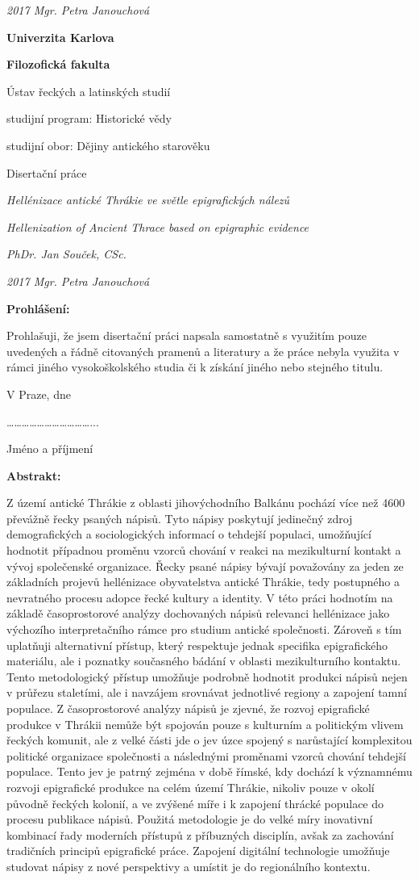 {\em 2017 Mgr. Petra Janouchová}

{\bf Univerzita Karlova}

{\bf Filozofická fakulta}

Ústav řeckých a latinských studií

studijní program: Historické vědy

studijní obor: Dějiny antického starověku

Disertační práce

{\em Hellénizace antické Thrákie ve světle epigrafických nálezů}

{\em Hellenization of Ancient Thrace based on epigraphic evidence}

{\em PhDr. Jan Souček, CSc.}

{\em 2017 Mgr. Petra Janouchová}

{\bf Prohlášení:}

Prohlašuji, že jsem disertační práci napsala samostatně s využitím pouze uvedených a řádně citovaných pramenů a literatury a že práce nebyla využita v rámci jiného vysokoškolského studia či k získání jiného nebo stejného titulu.

V Praze, dne

\ldots{}\ldots{}\ldots{}\ldots{}\ldots{}\ldots{}\ldots{}\ldots{}\ldots{}\ldots{}\ldots{}...

Jméno a příjmení

{\bf Abstrakt:}

Z území antické Thrákie z oblasti jihovýchodního Balkánu pochází více než 4600 převážně řecky psaných nápisů. Tyto nápisy poskytují jedinečný zdroj demografických a sociologických informací o tehdejší populaci, umožňující hodnotit případnou proměnu vzorců chování v reakci na mezikulturní kontakt a vývoj společenské organizace. Řecky psané nápisy bývají považovány za jeden ze základních projevů hellénizace obyvatelstva antické Thrákie, tedy postupného a nevratného procesu adopce řecké kultury a identity. V této práci hodnotím na základě časoprostorové analýzy dochovaných nápisů relevanci hellénizace jako výchozího interpretačního rámce pro studium antické společnosti. Zároveň s tím uplatňuji alternativní přístup, který respektuje jednak specifika epigrafického materiálu, ale i poznatky současného bádání v oblasti mezikulturního kontaktu. Tento metodologický přístup umožňuje podrobně hodnotit produkci nápisů nejen v průřezu staletími, ale i navzájem srovnávat jednotlivé regiony a zapojení tamní populace. Z časoprostorové analýzy nápisů je zjevné, že rozvoj epigrafické produkce v Thrákii nemůže být spojován pouze s kulturním a politickým vlivem řeckých komunit, ale z velké části jde o jev úzce spojený s narůstající komplexitou politické organizace společnosti a následnými proměnami vzorců chování tehdejší populace. Tento jev je patrný zejména v době římské, kdy dochází k významnému rozvoji epigrafické produkce na celém území Thrákie, nikoliv pouze v okolí původně řeckých kolonií, a ve zvýšené míře i k zapojení thrácké populace do procesu publikace nápisů. Použitá metodologie je do velké míry inovativní kombinací řady moderních přístupů z příbuzných disciplín, avšak za zachování tradičních principů epigrafické práce. Zapojení digitální technologie umožňuje studovat nápisy z nové perspektivy a umístit je do regionálního kontextu.

